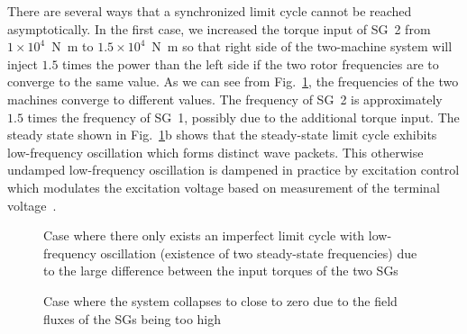 


There are several ways that a synchronized limit cycle cannot be reached asymptotically. In the first case, we increased the torque input of SG~2 from $1\times 10^4$~\unit{N.m} to $1.5\times 10^4$~\unit{N.m} so that right side of the two-machine system will inject $1.5$ times the power than the left side if the two rotor frequencies are to converge to the same value. As we can see from Fig.~\ref{fig_case1}, the frequencies of the two machines converge to different values. The frequency of SG~2 is approximately $1.5$ times the frequency of SG~1, possibly due to the additional torque input. The steady state shown in Fig.~\ref{fig_case1}b shows that the steady-state limit cycle exhibits low-frequency oscillation which forms distinct wave packets. This otherwise undamped low-frequency oscillation is dampened in practice by excitation control which modulates the excitation voltage based on measurement of the terminal voltage~\cite{vittal2019power}.


\begin{figure}[!t]
\centering 
{}
\hfil
{}\hspace{-0.04in}
\caption{Case where there only exists an imperfect limit cycle with low-frequency oscillation (existence of two steady-state frequencies) due to the large difference between the input torques of the two SGs}
\label{fig_case1}
\hfill\end{figure}

\begin{figure}[!t]
\centering 
{}
\caption{Case where the system collapses to close to zero due to the field fluxes of the SGs being too high}
\label{fig_case2}
\hfill\end{figure}

